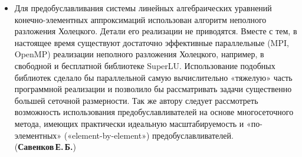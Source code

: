 \begin{frame}
    \begin{itemize}
    \justifying
        \item Для предобуславливания системы линейных алгебраических уравнений конечно-элементных аппроксимаций использован алгоритм неполного разложения Холецкого. Детали его реализации не приводятся. Вместе с тем, в настоящее время существуют достаточно эффективные параллельные (MPI, OpenMP) реализации неполного разложения Холецкого, например, в свободной и бесплатной библиотеке SuperLU. Использование подобных библиотек сделало бы параллельной самую вычислительно «тяжелую» часть программной реализации и позволило бы рассматривать задачи существенно большей сеточной размерности. Так же автору следует рассмотреть возможность использования предобуславливателей на основе многосеточного метода, имеющих практически идеальную масштабируемость и «по-элементных» («element-by-element») предобуславливателей. \\ (\textbf{Савенков\,Е.\,Б.})
    \end{itemize}
\end{frame}
